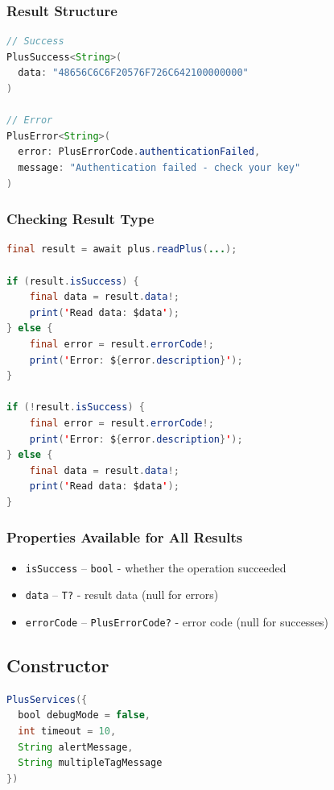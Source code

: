 \documentclass[a4paper,12pt]{article}
\begin{document}
\subsubsection*{Result Structure}
\begin{lstlisting}[language=Java]
// Success
PlusSuccess<String>(
  data: "48656C6C6F20576F726C642100000000"
)

// Error
PlusError<String>(
  error: PlusErrorCode.authenticationFailed,
  message: "Authentication failed - check your key"
)
\end{lstlisting}

\subsubsection*{Checking Result Type}
\begin{lstlisting}[language=Java]
final result = await plus.readPlus(...);

if (result.isSuccess) {
    final data = result.data!;
    print('Read data: $data');
} else {
    final error = result.errorCode!;
    print('Error: ${error.description}');
}

if (!result.isSuccess) {
    final error = result.errorCode!;
    print('Error: ${error.description}');
} else {
    final data = result.data!;
    print('Read data: $data');
}
\end{lstlisting}

\subsubsection*{Properties Available for All Results}
\begin{itemize}
    \item \texttt{isSuccess} -- \texttt{bool} - whether the operation succeeded
    \item \texttt{data} -- \texttt{T?} - result data (null for errors)
    \item \texttt{errorCode} -- \texttt{PlusErrorCode?} - error code (null for successes)
\end{itemize}

\newpage

\subsection{Constructor}
\begin{lstlisting}[language=Java]
PlusServices({
  bool debugMode = false, 
  int timeout = 10, 
  String alertMessage, 
  String multipleTagMessage
})
\end{lstlisting}
\end{document}
